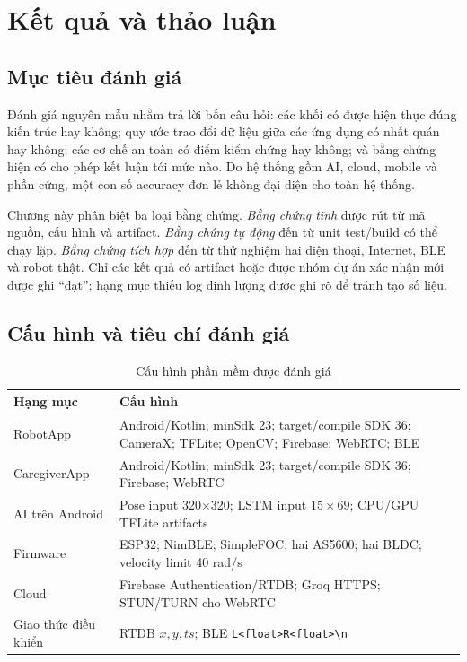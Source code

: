\section{Kết quả và thảo luận}

\subsection{Mục tiêu đánh giá}

Đánh giá nguyên mẫu nhằm trả lời bốn câu hỏi: các khối có được hiện thực đúng kiến trúc hay không; quy ước trao đổi dữ liệu giữa các ứng dụng có nhất quán hay không; các cơ chế an toàn có điểm kiểm chứng hay không; và bằng chứng hiện có cho phép kết luận tới mức nào. Do hệ thống gồm AI, cloud, mobile và phần cứng, một con số accuracy đơn lẻ không đại diện cho toàn hệ thống.

Chương này phân biệt ba loại bằng chứng. \textit{Bằng chứng tĩnh} được rút từ mã nguồn, cấu hình và artifact. \textit{Bằng chứng tự động} đến từ unit test/build có thể chạy lặp. \textit{Bằng chứng tích hợp} đến từ thử nghiệm hai điện thoại, Internet, BLE và robot thật. Chỉ các kết quả có artifact hoặc được nhóm dự án xác nhận mới được ghi ``đạt''; hạng mục thiếu log định lượng được ghi rõ để tránh tạo số liệu.

\subsection{Cấu hình và tiêu chí đánh giá}
\label{subsec:eval_criteria}

\begin{table}[htbp]
\centering
\caption{Cấu hình phần mềm được đánh giá}
\label{tab:evaluation_config}
\small
\begin{tabularx}{\textwidth}{|p{4.2cm}|X|}
\hline
\textbf{Hạng mục} & \textbf{Cấu hình} \\
\hline
RobotApp & Android/Kotlin; minSdk 23; target/compile SDK 36; CameraX; TFLite; OpenCV; Firebase; WebRTC; BLE \\
\hline
CaregiverApp & Android/Kotlin; minSdk 23; target/compile SDK 36; Firebase; WebRTC \\
\hline
AI trên Android & Pose input 320$\times$320; LSTM input $15\times69$; CPU/GPU TFLite artifacts \\
\hline
Firmware & ESP32; NimBLE; SimpleFOC; hai AS5600; hai BLDC; velocity limit 40 rad/s \\
\hline
Cloud & Firebase Authentication/RTDB; Groq HTTPS; STUN/TURN cho WebRTC \\
\hline
Giao thức điều khiển & RTDB $x,y,ts$; BLE \texttt{L<float>R<float>\textbackslash n} \\
\hline
\end{tabularx}
\end{table}

